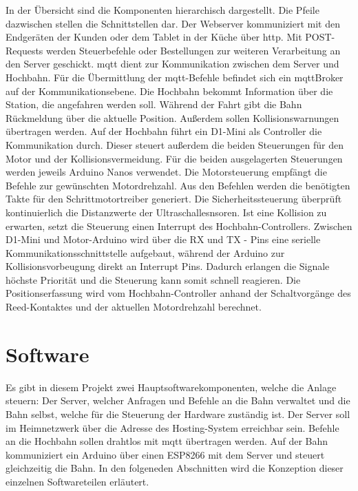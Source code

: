 In der Übersicht sind die Komponenten hierarchisch dargestellt. Die Pfeile dazwischen stellen die Schnittstellen dar. Der Webserver kommuniziert mit den Endgeräten der Kunden oder dem Tablet in der Küche über \acrshort{http}. Mit POST-Requests werden Steuerbefehle oder Bestellungen zur weiteren Verarbeitung an den Server geschickt.
\acrshort{mqtt} dient zur Kommunikation zwischen dem Server und Hochbahn. Für die Übermittlung der \acrshort{mqtt}-Befehle  befindet sich ein \acrshort{mqttBroker} auf der Kommunikationsebene. Die Hochbahn bekommt Information über die Station, die angefahren werden soll. Während der Fahrt gibt die Bahn Rückmeldung über die aktuelle Position. Außerdem sollen Kollisionswarnungen übertragen werden. Auf der Hochbahn führt ein D1-Mini als Controller die Kommunikation durch. Dieser steuert außerdem die beiden Steuerungen für den Motor und der Kollisionsvermeidung. Für die beiden ausgelagerten Steuerungen werden jeweils Arduino Nanos verwendet. Die Motorsteuerung empfängt die Befehle zur gewünschten Motordrehzahl. Aus den Befehlen werden die benötigten Takte für den Schrittmotortreiber generiert. Die Sicherheitssteuerung überprüft kontinuierlich die Distanzwerte der Ultraschallesnsoren. Ist eine Kollision zu erwarten, setzt die Steuerung einen Interrupt des Hochbahn-Controllers. Zwischen D1-Mini und Motor-Arduino wird über die RX und TX - Pins eine serielle Kommunikationsschnittstelle aufgebaut, während der Arduino zur Kollisionsvorbeugung direkt an Interrupt Pins. Dadurch erlangen die Signale höchste Priorität und die Steuerung kann somit schnell reagieren. Die Positionserfassung wird vom Hochbahn-Controller anhand der Schaltvorgänge des Reed-Kontaktes und der aktuellen Motordrehzahl berechnet. \newpage

\section{Software}
Es gibt in diesem Projekt zwei Hauptsoftwarekomponenten, welche die Anlage steuern: Der Server, welcher Anfragen und Befehle an die Bahn verwaltet und die Bahn selbst,
welche für die Steuerung der Hardware zuständig ist. Der Server soll im Heimnetzwerk über die Adresse des Hosting-System erreichbar sein. Befehle an die Hochbahn sollen drahtlos mit \acrshort{mqtt} übertragen werden.
Auf der Bahn kommuniziert ein Arduino über einen ESP8266 mit dem Server und steuert gleichzeitig die Bahn. In den folgeneden Abschnitten wird die Konzeption dieser einzelnen Softwareteilen erläutert.

